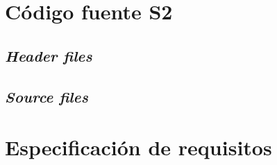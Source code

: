 \chapter{Código fuente S2}
\label{anex:source_code}
\section{\textit{Header files}}












\section{\textit{Source files}}







\chapter{Especificación de requisitos}
\label{anex:requirements}

